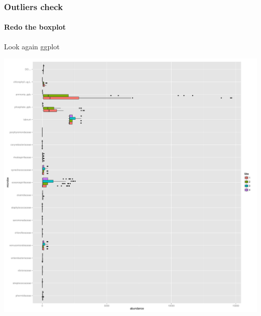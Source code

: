 \documentclass[12pt]{beamer}\usepackage[]{graphicx}\usepackage[]{color}
\makeatletter
\newenvironment{kframe}{%
 \def\at@end@of@kframe{}%
 \ifinner\ifhmode%
  \def\at@end@of@kframe{\end{minipage}}%
  \begin{minipage}{\columnwidth}%
 \fi\fi%
 \def\FrameCommand##1{\hskip\@totalleftmargin \hskip-\fboxsep
 \colorbox{shadecolor}{##1}\hskip-\fboxsep
     \hskip-\linewidth \hskip-\@totalleftmargin \hskip\columnwidth}%
 \MakeFramed {\advance\hsize-\width
   \@totalleftmargin\z@ \linewidth\hsize
   \@setminipage}}%
 {\par\unskip\endMakeFramed%
 \at@end@of@kframe}
\newenvironment{knitrout}{}{} %
\makeatother
\begin{document}
\begin{frame}[fragile]
  \frametitle{Outliers check}
  \framesubtitle{ Redo the boxplot}
  \begin{block}{Look again ggplot}
  \end{block}

\begin{knitrout}
\color{fgcolor}\begin{kframe}


{\ttfamily\noindent\color{warningcolor}{\#\# Warning: Removed 24 rows containing non-finite values (stat\_boxplot).}}\end{kframe}
\includegraphics[width=.85\linewidth]{figure/chunk10viii-1} 

\end{knitrout}
\end{frame} 
\end{document}
